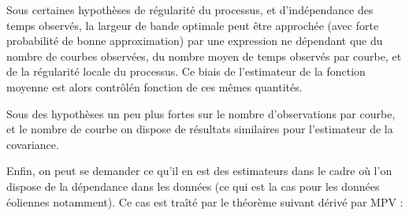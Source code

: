 \begin{thm*}
    Sous certaines hypothèses de régularité du processus, et d'indépendance des temps observés, la largeur de bande optimale peut être approchée (avec forte probabilité de bonne approximation) par une expression ne dépendant que du nombre de courbes observées, du nombre moyen de temps observés par courbe, et de la régularité locale du processus. Ce biais de l'estimateur de la fonction moyenne est alors contrôlén fonction de ces mêmes quantités.

    Sous des hypothèses un peu plus fortes sur le nombre d'observations par courbe, et le nombre de courbe on dispose de résultats similaires pour l'estimateur de la covariance.
\end{thm*}


Enfin, on peut se demander ce qu'il en est des estimateurs dans le cadre où l'on dispose de la dépendance dans les données (ce qui est la cas pour les données éoliennes notamment). Ce cas est traîté par le théorème suivant dérivé par MPV :

\begin{thm*}

\end{thm*}

